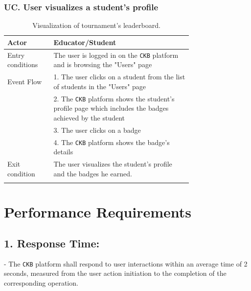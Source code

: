 \subsubsection*{UC\cuc . User visualizes a student's profile}
\begin{center}
    \begin{longtable}{lp{0.75\linewidth}}
        \hline
        Actor            & Educator/Student \\
        \hline
        Entry conditions & The user is logged in on the \verb|CKB| platform and is browsing the "Users" page\\
        \hline
        Event Flow      
        & 1. The user clicks on a student from the list of students in the "Users" page\\
        & 2. The \verb|CKB| platform shows the student's profile page which includes the badges achieved by the student\\
        & 3. The user clicks on a badge\\
        & 4. The \verb|CKB| platform shows the badge's details\\
        \hline
        Exit condition   & The user visualizes the student's profile and the badges he earned.   \\ 
        \hline
        \caption{Visualization of tournament's leaderboard.}
        \label{tab: view_profile_use_case}
    \end{longtable}

\end{center}


\section{Performance Requirements}
\label{subsec:performance_requirements}%

\subsection*{1. Response Time:}
   - The \verb|CKB| platform shall respond to user interactions within an average time of 2 seconds, measured from the user action initiation to the completion of the corresponding operation.

